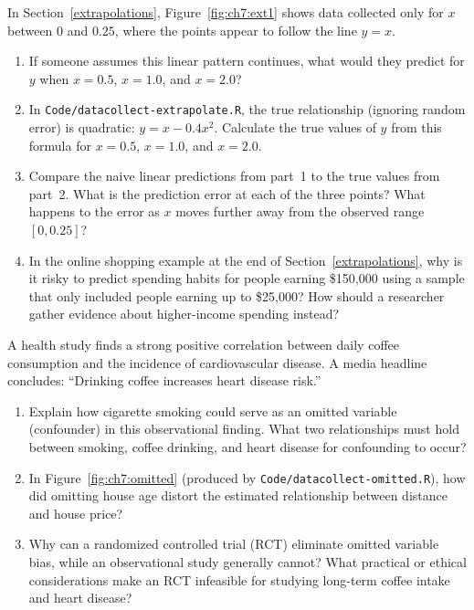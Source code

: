 \begin{exercise}
  In Section~\ref{extrapolations}, Figure~\ref{fig:ch7:ext1} shows data
  collected only for $x$ between $0$ and $0.25$, where the points appear to
  follow the line $y = x$.
  \begin{enumerate}
  \item If someone assumes this linear pattern continues, what would they
    predict for $y$ when $x = 0.5$, $x = 1.0$, and $x = 2.0$?
  \item In \lstinline{Code/datacollect-extrapolate.R}, the true relationship
    (ignoring random error) is quadratic: $y = x - 0.4x^2$. Calculate the true
    values of $y$ from this formula for $x = 0.5$, $x = 1.0$, and $x = 2.0$.
  \item Compare the naive linear predictions from part~1 to the true values from
    part~2. What is the prediction error at each of the three points? What
    happens to the error as $x$ moves further away from the observed range
    $[0, 0.25]$?
  \item In the online shopping example at the end of
    Section~\ref{extrapolations}, why is it risky to predict spending habits for
    people earning \$150,000 using a sample that only included people earning up
    to \$25,000? How should a researcher gather evidence about higher-income
    spending instead?
  \end{enumerate}
\end{exercise}

\begin{exercise}
  A health study finds a strong positive correlation between daily coffee
  consumption and the incidence of cardiovascular disease. A media headline
  concludes: ``Drinking coffee increases heart disease risk.''
  \begin{enumerate}
  \item Explain how cigarette smoking could serve as an omitted variable
    (confounder) in this observational finding. What two relationships must hold
    between smoking, coffee drinking, and heart disease for confounding to
    occur?
  \item In Figure~\ref{fig:ch7:omitted} (produced by
    \lstinline{Code/datacollect-omitted.R}), how did omitting house age distort
    the estimated relationship between distance and house price?
  \item Why can a randomized controlled trial (RCT) eliminate omitted variable
    bias, while an observational study generally cannot? What practical or
    ethical considerations make an RCT infeasible for studying long-term coffee
    intake and heart disease?
  \end{enumerate}
\end{exercise}

